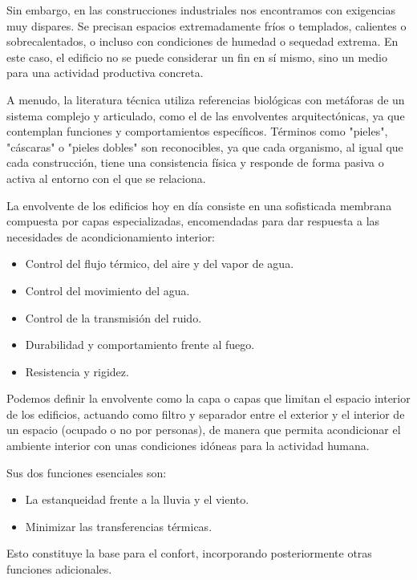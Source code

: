 Sin embargo, en las construcciones industriales nos encontramos con exigencias muy dispares. Se precisan espacios extremadamente fríos o templados, calientes o sobrecalentados, o incluso con condiciones de humedad o sequedad extrema. En este caso, el edificio no se puede considerar un fin en sí mismo, sino un medio para una actividad productiva concreta.

A menudo, la literatura técnica utiliza referencias biológicas con metáforas de un sistema complejo y articulado, como el de las envolventes arquitectónicas, ya que contemplan funciones y comportamientos específicos. Términos como "pieles", "cáscaras" o "pieles dobles" son reconocibles, ya que cada organismo, al igual que cada construcción, tiene una consistencia física y responde de forma pasiva o activa al entorno con el que se relaciona.

La envolvente de los edificios hoy en día consiste en una sofisticada membrana compuesta por capas especializadas, encomendadas para dar respuesta a las necesidades de acondicionamiento interior:

\begin{itemize}
    \item Control del flujo térmico, del aire y del vapor de agua.
    \item Control del movimiento del agua.
    \item Control de la transmisión del ruido.
    \item Durabilidad y comportamiento frente al fuego.
    \item Resistencia y rigidez.
\end{itemize}

Podemos definir la envolvente como la capa o capas que limitan el espacio interior de los edificios, actuando como filtro y separador entre el exterior y el interior de un espacio (ocupado o no por personas), de manera que permita acondicionar el ambiente interior con unas condiciones idóneas para la actividad humana.

Sus dos funciones esenciales son:

\begin{itemize}
    \item La estanqueidad frente a la lluvia y el viento.
    \item Minimizar las transferencias térmicas.
\end{itemize}

Esto constituye la base para el confort, incorporando posteriormente otras funciones adicionales.

